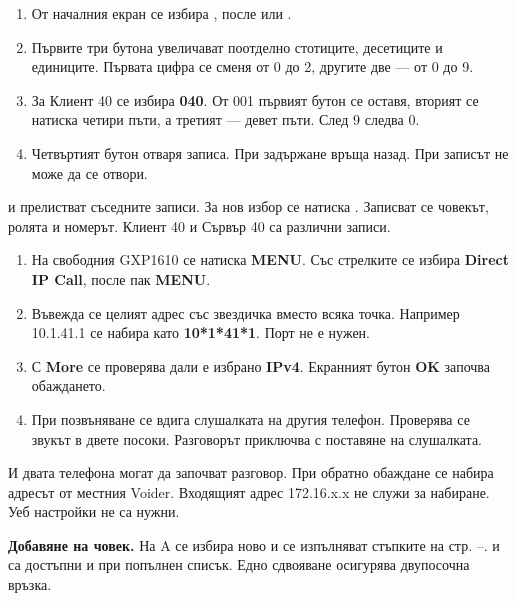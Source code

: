 \begin{enumerate}
\item От началния екран се избира  \arr {}, после  или .
\item Първите три бутона увеличават поотделно стотиците, десетиците и единиците. Първата цифра се сменя от 0 до 2, другите две --- от 0 до 9.
\item За Клиент 40 се избира \textbf{040}. От 001 първият бутон се оставя, вторият се натиска четири пъти, а третият --- девет пъти. След 9 следва 0.
\item Четвъртият бутон  отваря записа. При задържане връща назад. При  записът не може да се отвори.
\end{enumerate}
 и  прелистват съседните записи. За нов избор се натиска  \arr {}. Записват се човекът, ролята и номерът. Клиент 40 и Сървър 40 са различни записи.

\emergency
{}
\begin{enumerate}
\item На свободния GXP1610 се натиска \textbf{MENU}. Със стрелките се избира \textbf{Direct IP Call}, после пак \textbf{MENU}.
\item Въвежда се целият адрес със звездичка вместо всяка точка. Например 10.1.41.1 се набира като \textbf{10*1*41*1}. Порт не е нужен.
\item С \textbf{More} се проверява дали е избрано \textbf{IPv4}. Екранният бутон \textbf{OK} започва обаждането.
\item При позвъняване се вдига слушалката на другия телефон. Проверява се звукът в двете посоки. Разговорът приключва с поставяне на слушалката.
\end{enumerate}
И двата телефона могат да започват разговор. При обратно обаждане се набира адресът от местния Voider. Входящият адрес 172.16.x.x не служи за набиране. Уеб настройки не са нужни.

\textbf{Добавяне на човек.} На A се избира ново  и се изпълняват стъпките на стр. \pageref{bg:share}–\pageref{bg:add}.  и  са достъпни и при попълнен списък. Едно сдвояване осигурява двупосочна връзка.

